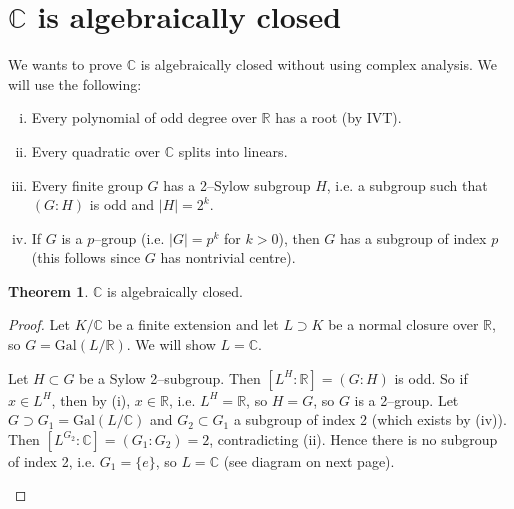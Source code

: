 \documentclass{article}
\theoremstyle{definition}
\newtheorem{theorem}{Theorem}[section]
\begin{document}
\section{$\mathbb{C}$ is algebraically closed}
We wants to prove $\mathbb{C}$ is algebraically closed without using complex analysis. We will use the following:
\begin{enumerate}[(i)]
    \item Every polynomial of odd degree over $\mathbb{R}$ has a root (by IVT).
    \item Every quadratic over $\mathbb{C}$ splits into linears.
    \item Every finite group $G$ has a 2--Sylow subgroup $H$, i.e. a subgroup such that $(G:H)$ is odd and $|H|=2^k$.
    \item If $G$ is a $p$--group (i.e. $|G|=p^k$ for $k>0$), then $G$ has a subgroup of index $p$ (this follows since $G$ has nontrivial centre).
\end{enumerate}
\begin{theorem}
    $\mathbb{C}$ is algebraically closed.
\end{theorem}
\begin{proof}
    Let $K/\mathbb{C}$ be a finite extension and let $L \supset K$ be a normal closure over $\mathbb{R}$, so $G=\text{Gal}(L/\mathbb{R})$. We will show $L=\mathbb{C}$.
    \vspace{1mm}
    
    Let $H \subset G$ be a Sylow 2--subgroup. Then $[L^H : \mathbb{R}] = (G:H)$ is odd. So if $x \in L^H$, then by (i), $x \in \mathbb{R}$, i.e. $L^H=\mathbb{R}$, so $H=G$, so $G$ is a 2--group. Let $G \supset G_1 = \text{Gal}(L/\mathbb{C})$ and $G_2 \subset G_1$ a subgroup of index 2 (which exists by (iv)). Then $[L^{G_2}:\mathbb{C}]=(G_1 : G_2) = 2$, contradicting (ii). Hence there is no subgroup of index 2, i.e. $G_1=\{e\}$, so $L=\mathbb{C}$ (see diagram on next page).
    \begin{figure}[H]
        \centering
    \end{figure}
\end{proof}
\end{document}

